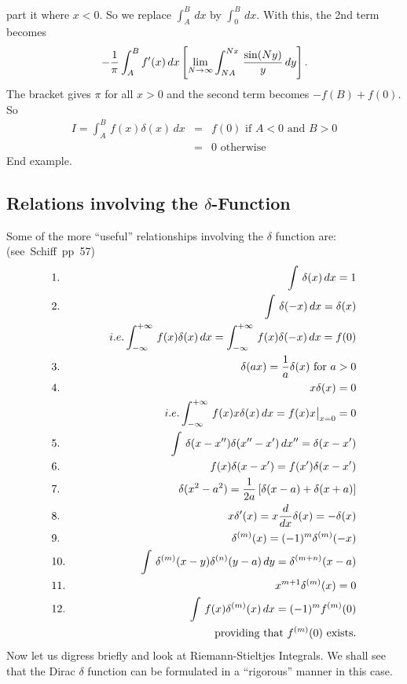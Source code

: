 part it where $x<0$. So we replace $\int_A^B\,dx$ by $\int_0^B\, dx$. With this, the 2nd term becomes 
$$- {1\over\pi} \int_A^B f'(x)\,dx \left[ \lim_{N\rightarrow\infty} \int_{NA}^{Nx} \, {\sin(Ny)\over y} \,dy \right].$$
The bracket gives $\pi$ for all $x>0$ and the second term becomes $-f(B) + f(0)$. So 
\begin{eqnarray*}
I = \int_A^B\, f(x)\delta(x)\, dx &=& f(0) \mbox{ if } A<0 \mbox{ and } B>0\\
&=& 0 \mbox{ otherwise}
\end{eqnarray*}
End example.\\

\subsection{Relations involving the $\delta$-Function}
Some of the more ``useful'' relationships involving the $\delta$ function are: \hbox{(see Schiff pp 57)}
\begin{eqnarray*}
&1.~& \int\, \delta(x)\, dx  = 1\\
&2.~& \int\, \delta(-x)\, dx = \delta(x) \\
&\null&~~~~~~~~~i.e. \int_{-\infty}^{+\infty}\, f(x)\delta(x) \, dx = \int_{-\infty}^{+\infty}\, f(x)\delta(-x) \, dx = f(0)\\
&3.~& \delta(ax) = {1\over a} \delta(x) \mbox{ for } a> 0\\
&4.~& x\delta(x) = 0\\
&\null&~~~~~~~~~ i.e. \int_{-\infty}^{+\infty}\, f(x) x \delta(x) \, dx = f(x) x \big|_{x=0} = 0 \\
&5.~& \int\,\delta(x-x'')\delta(x''- x')\, dx'' = \delta(x-x')\\
&6.~& f(x)\delta(x-x') = f(x')\delta(x-x')\\
&7.~& \delta(x^2 - a^2) = {1\over2a} \left[\delta(x-a) + \delta(x+a)\right]\\
&8.~& x\delta'(x) = x{d\over dx}\delta(x) = -\delta(x)\\
&9.~& \delta^{(m)}(x) = (-1)^m \delta^{(m)}(-x)\\
&10.& \int\, \delta^{(m)}(x-y) \delta^{(n)}(y-a)\, dy = \delta^{(m+n)}(x-a)\\
&11.& x^{m+1}\delta^{(m)}(x) = 0\\
&12.& \int\, f(x) \delta^{(m)}(x)\, dx = (-1)^m f^{(m)}(0)\\
&\null&~~~~~~~~~~\mbox{ providing that } f^{(m)}(0) \mbox{ exists}.
\end{eqnarray*}
Now let us digress briefly and look at Riemann-Stieltjes Integrals.
We shall see that the Dirac $\delta$ function can be formulated in a ``rigorous'' manner in this case. 

